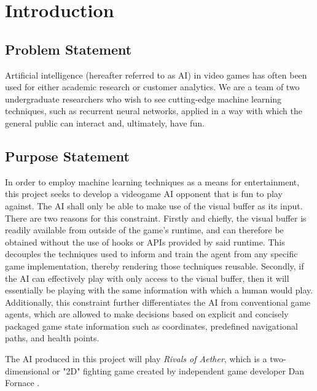 \chapter{Introduction}


\section{Problem Statement}

Artificial intelligence (hereafter referred to as AI) in video games has often been used for either academic research or customer analytics. We are a team of two undergraduate researchers who wish to see cutting-edge machine learning techniques, such as recurrent neural networks, applied in a way with which the general public can interact and, ultimately, have fun.




\section{Purpose Statement}

 In order to employ machine learning techniques as a means for entertainment, this project seeks to develop a videogame AI opponent that is fun to play against. The AI shall only be able to make use of the visual buffer as its input. There are two reasons for this constraint. Firstly and chiefly, the visual buffer is readily available from outside of the game's runtime, and can therefore be obtained without the use of hooks or APIs provided by said runtime. This decouples the techniques used to inform and train the agent from any specific game implementation, thereby rendering those techniques reusable. Secondly, if the AI can effectively play with only access to the visual buffer, then it will essentially be playing with the same information with which a human would play. Additionally, this constraint further differentiates the AI from conventional game agents, which are allowed to make decisions based on explicit and concisely packaged game state information such as coordinates, predefined navigational paths, and health points.
 
 The AI produced in this project will play {\it Rivals of Aether}, which is a two-dimensional or "2D" fighting game created by independent game developer Dan Fornace \cite{RivalsofAether}.

